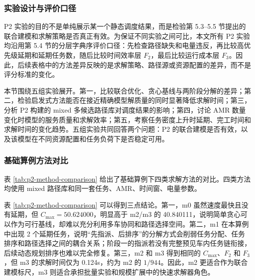 \subsubsection{实验设计与评价口径}

P2 实验的目的不是单纯展示某一个静态调度结果，而是检验第 5.3--5.5 节提出的联合建模和求解策略是否真正有效。为保证不同实验之间可比，本文所有 P2 实验均沿用第 5.4 节的分层字典序评价口径：先检查路径缺失和电量违反，再比较高优先级延期和延期任务数，随后比较时间效率层 $F_2$，最后比较运行成本层 $F_3$。因此，后续表格中的方法差异反映的是求解策略、路径源或资源配置的差异，而不是评分标准的变化。

本节围绕五组实验展开。第一，比较联合优化、贪心基线与两阶段分解的差异；第二，检验启发式方法能否在接近精确模型解质量的同时显著降低求解时间；第三，分析 P2 构建的 mixed 多候选路径库对调度结果的影响；第四，讨论 AMR 数量变化时模型的服务质量和求解效率；第五，考察任务密度上升时延期、完工时间和求解时间的变化趋势。五组实验共同回答两个问题：P2 的联合建模是否有效，以及该模型在不同资源配置和任务负荷下是否稳定可用。

\subsubsection{基础算例方法对比}

表 \ref{tab:p2-method-comparison} 给出了基础算例下四类求解方法的对比。四类方法均使用 mixed 路径库和同一套任务、AMR、时间窗、电量参数。

\begin{table}[H]
\centering
\small
{}
\caption{P2 基础算例方法对比}
\label{tab:p2-method-comparison}
\end{table}

表 \ref{tab:p2-method-comparison} 可以得到三点结论。第一，m0 虽然速度最快且没有延期，但 $C_{\max}=50.624000$，明显高于 m2/m3 的 40.840111，说明简单贪心可以作为可行基线，却难以充分利用多车协同和路径选择空间。第二，m1 在本算例中出现 2 个延期任务，说明“先指派、后排序”的分解方式会削弱任务分配、任务排序和路径选择之间的耦合关系；阶段一的指派若没有完整预见车内任务链衔接，后续动态规划排序也难以完全修复。第三，m2 和 m3 得到相同的 $C_{\max}$、$F_2$ 和 $F_3$，但 m3 的求解时间仅为 0.124s，约为 m2 的 $1/944$。因此，m2 更适合作为联合建模标尺，m3 则适合承担批量实验和规模扩展中的快速求解器角色。

